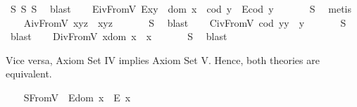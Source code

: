 \begin{isabellebody}
\isamarkupfalse%
\ S{}\ S{}\ S{}\ \isamarkupfalse%
\ blast%
\endisatagproof
{\isafoldproof}%
%
\isadelimproof
\isanewline
%
\endisadelimproof
\ \ \isamarkupfalse%
\ E\isactrlsub i\isactrlsub vFromV{\isacharcolon}\ {\isachardoublequoteopen}E{\isacharparenleft}x{\isasymcdot}y{\isacharparenright}\ \isactrlbold {\isasymleftrightarrow}\ {\isacharparenleft}dom\ x\ {\isasymcong}\ cod\ y\ \isactrlbold {\isasymand}\ E{\isacharparenleft}cod\ y{\isacharparenright}{\isacharparenright}{\isachardoublequoteclose}\ \isanewline
%
\isadelimproof
\ \ \ \ %
\endisadelimproof
%
\isatagproof
{}\isamarkupfalse%
\ S{}\ \isamarkupfalse%
\ metis%
\endisatagproof
{\isafoldproof}%
%
\isadelimproof
\isanewline
%
\endisadelimproof
\ \ \isamarkupfalse%
\ A\isactrlsub i\isactrlsub vFromV{\isacharcolon}\ {\isachardoublequoteopen}x{\isasymcdot}{\isacharparenleft}y{\isasymcdot}z{\isacharparenright}\ {\isasymcong}\ {\isacharparenleft}x{\isasymcdot}y{\isacharparenright}{\isasymcdot}z{\isachardoublequoteclose}\ \isanewline
%
\isadelimproof
\ \ \ \ %
\endisadelimproof
%
\isatagproof
{}\isamarkupfalse%
\ S{}\ \isamarkupfalse%
\ blast%
\endisatagproof
{\isafoldproof}%
%
\isadelimproof
\isanewline
%
\endisadelimproof
\ \ \isamarkupfalse%
\ C\isactrlsub i\isactrlsub vFromV{\isacharcolon}\ {\isachardoublequoteopen}{\isacharparenleft}cod\ y{\isacharparenright}{\isasymcdot}y\ {\isasymcong}\ y{\isachardoublequoteclose}\ \isanewline
%
\isadelimproof
\ \ \ \ %
\endisadelimproof
%
\isatagproof
{}\isamarkupfalse%
\ S{}\ \isamarkupfalse%
\ blast%
\endisatagproof
{\isafoldproof}%
%
\isadelimproof
\isanewline
%
\endisadelimproof
\ \ \isamarkupfalse%
\ D\isactrlsub i\isactrlsub vFromV{\isacharcolon}\ {\isachardoublequoteopen}x{\isasymcdot}{\isacharparenleft}dom\ x{\isacharparenright}\ {\isasymcong}\ x{\isachardoublequoteclose}\ \isanewline
%
\isadelimproof
\ \ \ \ %
\endisadelimproof
%
\isatagproof
{}\isamarkupfalse%
\ S{}\ \isamarkupfalse%
\ blast%
\endisatagproof
{\isafoldproof}%
%
\isadelimproof
%
\endisadelimproof
%
\begin{isamarkuptext}%
Vice versa, Axiom Set IV implies Axiom Set V. Hence, both theories are
 equivalent.%
\end{isamarkuptext}\isamarkuptrue%
\ \ \isamarkupfalse%
\ S{}FromV{\isacharcolon}\ \ {\isachardoublequoteopen}E{\isacharparenleft}dom\ x{\isacharparenright}\ \isactrlbold {\isasymrightarrow}\ E\ x{\isachardoublequoteclose}\ \isanewline

\end{isabellebody}
